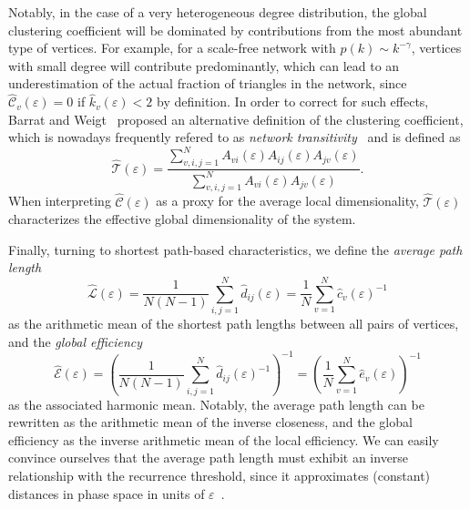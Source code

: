Notably, in the case of a very heterogeneous degree distribution, the global clustering coefficient will be dominated by contributions from the most abundant type of vertices. For example, for a scale-free network with $p(k)\sim k^{-\gamma}$, vertices with small degree will contribute predominantly, which can lead to an underestimation of the actual fraction of triangles in the network, since $\hat{\mathcal{C}}_v(\varepsilon)=0$ if $\hat{k}_v(\varepsilon)<2$ by definition. In order to correct for such effects, Barrat and Weigt~\cite{Barrat2000} proposed an alternative definition of the clustering coefficient, which is nowadays frequently refered to as \textit{network transitivity}~\cite{Boccaletti2006} and is defined as
\begin{equation}
\hat{\mathcal{T}}(\varepsilon)= \frac{\sum_{v,i,j=1}^N A_{vi}(\varepsilon) A_{ij}(\varepsilon) A_{jv}(\varepsilon)}{\sum_{v,i,j=1}^N A_{vi}(\varepsilon) A_{jv}(\varepsilon)}.
\label{eq:transitivity}
\end{equation}
\noindent
When interpreting $\hat{\mathcal{C}}(\varepsilon)$ as a proxy for the average local dimensionality, $\hat{\mathcal{T}}(\varepsilon)$ characterizes the effective global dimensionality of the system.

Finally, turning to shortest path-based characteristics, we define the \textit{average path length}
\begin{equation}
\hat{\mathcal{L}}(\varepsilon)=\frac{1}{N(N-1)} \sum_{i,j=1}^N \hat{d}_{ij}(\varepsilon) = \frac{1}{N} \sum_{v=1}^N \hat{c}_v(\varepsilon)^{-1}
\label{eq:apl}
\end{equation}
\noindent
as the arithmetic mean of the shortest path lengths between all pairs of vertices, and the \textit{global efficiency}
\begin{equation}
\hat{\mathcal{E}}(\varepsilon)=\left(\frac{1}{N(N-1)} \sum_{i,j=1}^N \hat{d}_{ij}(\varepsilon)^{-1} \right)^{-1} = \left( \frac{1}{N} \sum_{v=1}^N \hat{e}_v(\varepsilon) \right)^{-1}
\label{eq:globefficiency}
\end{equation}
\noindent
as the associated harmonic mean. Notably, the average path length can be rewritten as the arithmetic mean of the inverse closeness, and the global efficiency as the inverse arithmetic mean of the local efficiency. We can easily convince ourselves that the average path length must exhibit an inverse relationship with the recurrence threshold, since it approximates (constant) distances in phase space in units of $\varepsilon$~\cite{Donner2010NJP}.


